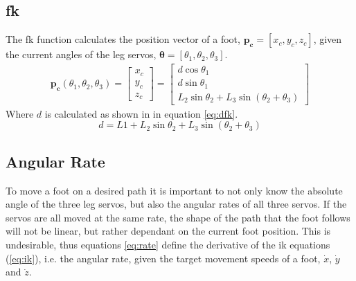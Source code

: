     \subsection{\acf{fk}}
        The \ac{fk} function calculates the position vector of a foot, \(\boldsymbol{p_c} = [x_c,y_c,z_c]\),
        given the current angles of the leg servos, \(\boldsymbol{\theta} = [\theta_1, \theta_2, \theta_3]\).
        \begin{align}
            \boldsymbol{p_c}(\theta_1,\theta_2,\theta_3) =
                            \begin{bmatrix}
                                x_c\\
                                y_c\\
                                z_c
                            \end{bmatrix}
                            =
                            \begin{bmatrix}
                                d\cos{\theta_1}\\
                                d\sin{\theta_1}\\
                                L_2\sin{\theta_2} + L_3\sin{\left(\theta_2 + \theta_3\right)}
                            \end{bmatrix}
        \end{align}
        Where \(d\) is calculated as shown in in equation \ref{eq:dfk}.
        \begin{equation}\label{eq:dfk}
            d = L1 + L_2\sin{\theta_2} + L_3\sin{(\theta_2 + \theta_3)}
        \end{equation}
    
    \subsection{Angular Rate}
    To move a foot on a desired path it is important to not only know the absolute angle of the three leg servos, but also the angular rates of all three
    servos. If the servos are all moved at the same rate, the shape of the path that the foot follows will not be linear, but rather dependant on the
    current foot position. This is undesirable, thus equations \ref{eq:rate} define the derivative of the \ac{ik} equations (\ref{eq:ik}), i.e. the angular
    rate, given the target movement speeds of a foot, \(\dot{x}\), \(\dot{y}\) and \(\dot{z}\).

